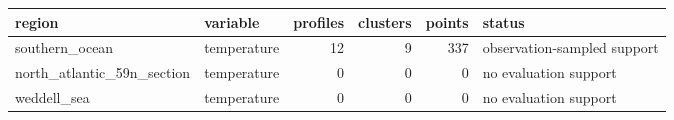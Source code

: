 \begin{tabular}{llrrrl}
\toprule
region & variable & profiles & clusters & points & status \\
\midrule
southern_ocean & temperature & 12 & 9 & 337 & observation-sampled support \\
north_atlantic_59n_section & temperature & 0 & 0 & 0 & no evaluation support \\
weddell_sea & temperature & 0 & 0 & 0 & no evaluation support \\
\bottomrule
\end{tabular}
